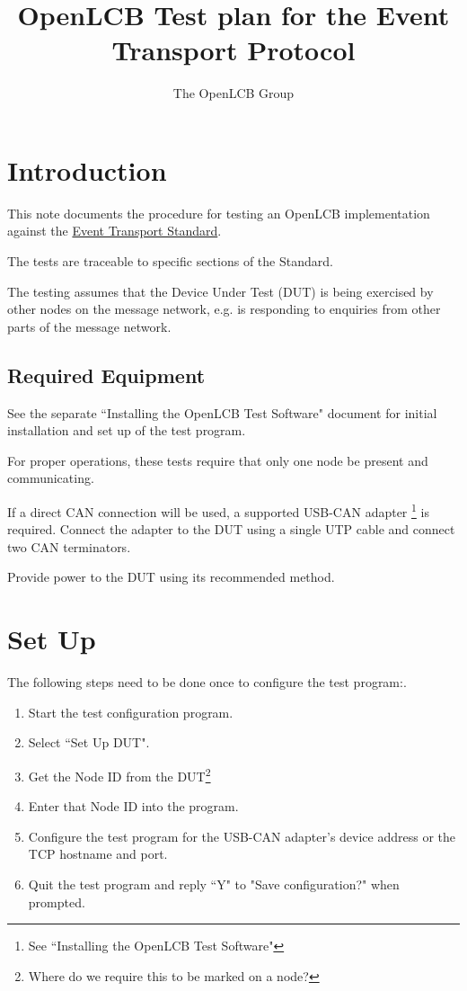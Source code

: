 \documentclass[11pt]{article}
\title{OpenLCB Test plan for the Event Transport Protocol}
\author{The OpenLCB Group}
\begin{document}
\maketitle


\section{Introduction}

This note documents the procedure for testing an OpenLCB implementation against the 
\href{https://nbviewer.org/github/openlcb/documents/blob/master/standards/EventTransportS.pdf}{Event Transport Standard}.

The tests are traceable to specific sections of the Standard.

The testing assumes that the Device Under Test (DUT) is being exercised by other
nodes on the message network, 
e.g. is responding to enquiries from other parts of the message network.

\subsection{Required Equipment}

See the separate ``Installing the OpenLCB Test Software" document for initial installation 
and set up of the test program.

For proper operations, these tests require that only one node be present and communicating.

If a direct CAN connection will be used,
a supported USB-CAN adapter
    \footnote{See ``Installing the OpenLCB Test Software"}
is required. 
Connect the adapter to the DUT using a single UTP cable and connect two CAN terminators.

Provide power to the DUT using its recommended method.

\section{Set Up}
The following steps need to be done once to configure the test program:.
\begin{enumerate}
\item Start the test configuration program. 
\item Select ``Set Up DUT".
\item Get the Node ID from the DUT\footnote{Where do we require this to be marked on a node?} 
\item Enter that Node ID into the program.
\item Configure the test program for the USB-CAN adapter's device address
        or the TCP hostname and port.
\item Quit the test program and reply ``Y" to "Save configuration?" when prompted.
\end{enumerate}
\end{document}
